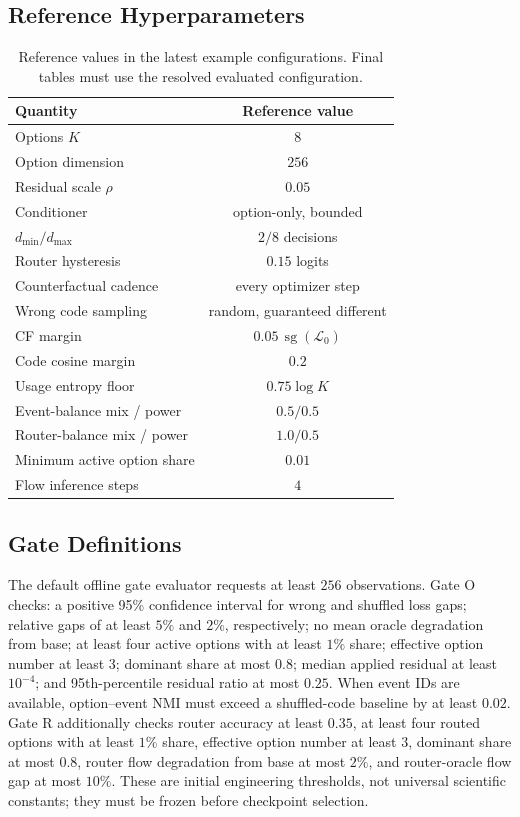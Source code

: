 \subsection{Reference Hyperparameters}

\begin{table}[h]
\centering
\scriptsize
\setlength{\tabcolsep}{4pt}
\begin{tabular}{lc}
\toprule
Quantity & Reference value \\
\midrule
Options \(K\) & \(8\) \\
Option dimension & \(256\) \\
Residual scale \(\rho\) & \(0.05\) \\
Conditioner & option-only, bounded \\
\(d_{\min}/d_{\max}\) & \(2/8\) decisions \\
Router hysteresis & \(0.15\) logits \\
Counterfactual cadence & every optimizer step \\
Wrong code sampling & random, guaranteed different \\
CF margin & \(0.05\,\operatorname{sg}(\mathcal{L}_0)\) \\
Code cosine margin & \(0.2\) \\
Usage entropy floor & \(0.75\log K\) \\
Event-balance mix / power & \(0.5/0.5\) \\
Router-balance mix / power & \(1.0/0.5\) \\
Minimum active option share & \(0.01\) \\
Flow inference steps & \(4\) \\
\bottomrule
\end{tabular}
\caption{Reference values in the latest example configurations.  Final tables
must use the resolved evaluated configuration.}
\label{tab:reference-hyperparameters}
\end{table}

\subsection{Gate Definitions}

The default offline gate evaluator requests at least \(256\) observations.
Gate O checks: a positive 95\% confidence interval for wrong and shuffled loss
gaps; relative gaps of at least \(5\%\) and \(2\%\), respectively; no mean
oracle degradation from base; at least four active options with at least
\(1\%\) share; effective option number at least \(3\); dominant share at most
\(0.8\); median applied residual at least \(10^{-4}\); and 95th-percentile
residual ratio at most \(0.25\).  When event IDs are available, option--event
NMI must exceed a shuffled-code baseline by at least \(0.02\).  Gate R
additionally checks router accuracy at least \(0.35\), at least four routed
options with at least \(1\%\) share, effective option number at least \(3\),
dominant share at most \(0.8\), router flow degradation from base at most
\(2\%\), and router-oracle flow gap at most \(10\%\).  These are initial
engineering thresholds, not universal scientific constants; they must be
frozen before checkpoint selection.

